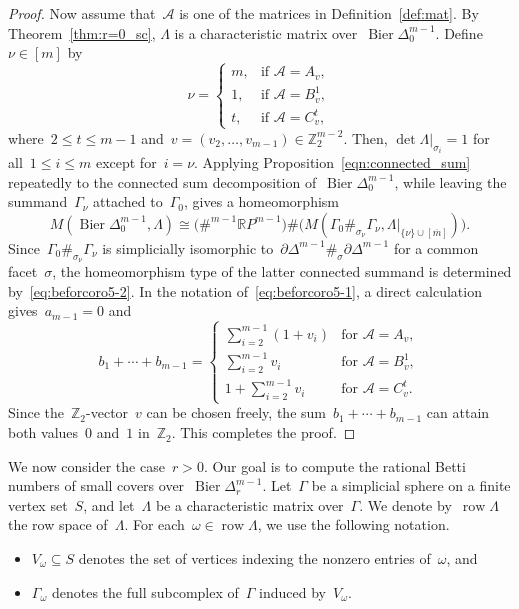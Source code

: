\documentclass[11pt]{amsart}
\theoremstyle{plain}
\numberwithin{equation}{section}
\theoremstyle{definition}
\newcommand{\Z}{\mathbb{Z}}
\newcommand{\cA}{\mathcal{A}}
\newcommand{\RP}{\mathbb{R}P}
\DeclareMathOperator{\row}{row}
\DeclareMathOperator{\Bier}{Bier}
\begin{document}
\begin{proof}
    Now assume that~$\cA$ is one of the matrices in Definition~\ref{def:mat}.
    By Theorem~\ref{thm:r=0_sc}, $\Lambda$ is a characteristic matrix over~$\Bier\Delta_{0}^{m-1}$.
    Define~$\nu \in[m]$ by
    $$
        \nu = \begin{cases}
            m, & \text{if } \cA = A_v ,\\
            1, & \text{if } \cA = B_v^1, \\
            t, & \text{if } \cA = C_v^t,
        \end{cases}
    $$
    where~$2 \leq t \leq m-1$ and~$v=(v_2,\ldots, v_{m-1})\in \Z_2^{m-2}$.
    Then, $\det \Lambda|_{\sigma_i} =1$ for all~$1 \leq i \leq m$ except for~$i = \nu$.
    Applying Proposition~\ref{eqn:connected_sum} repeatedly to the connected sum decomposition of~$\Bier\Delta_0^{m-1}$, while leaving the summand~$\Gamma_\nu$ attached to~$\Gamma_0$, gives a homeomorphism
    $$
        M(\Bier\Delta_{0}^{m-1},\Lambda) \cong \big( \#^{m-1}\RP^{m-1}\big) \# \big(M(\Gamma_0 \#_{\sigma_\nu}\Gamma_{\nu},\Lambda|_{\{\nu\}\cup[\overline{m}]})\big). 
    $$
    Since~$\Gamma_0 \#_{\sigma_\nu}\Gamma_{\nu}$ is simplicially isomorphic to~$\partial\Delta^{m-1}\#_{\sigma}\partial\Delta^{m-1}$ for a common facet~$\sigma$, the homeomorphism type of the latter connected summand is determined by~\eqref{eq:beforcoro5-2}.
    In the notation of~\eqref{eq:beforcoro5-1}, a direct calculation gives~$a_{m-1} =0$ and   
    $$
        b_1+\cdots +b_{m-1} =
            \begin{cases}
                \sum\limits_{i=2}^{m-1}(1+v_i) & \text{for } \cA = A_v, \\
                \sum\limits_{i=2}^{m-1}v_i & \text{for } \cA = B^1_v, \\
                1+\sum\limits_{i=2}^{m-1}v_i & \text{for } \cA = C_v^t.
            \end{cases}
    $$
    Since the~$\Z_2$-vector~$v$ can be chosen freely, the sum~$b_1+\cdots+b_{m-1}$ can attain both values~$0$ and~$1$ in~$\Z_2$.
    This completes the proof.
\end{proof}

We now consider the case~$r>0$.
Our goal is to compute the rational Betti numbers of small covers over~$\Bier\Delta^{m-1}_{r}$.
Let~$\Gamma$ be a simplicial sphere on a finite vertex set~$S$, and let~$\Lambda$ be a characteristic matrix over~$\Gamma$. 
We denote by~$\row\Lambda$ the row space of~$\Lambda$.
For each~$\omega\in\row\Lambda$, we use the following notation.
\begin{itemize}
    \item $V_\omega\subseteq S$ denotes the set of vertices indexing the nonzero entries of~$\omega$, and
    \item $\Gamma_\omega$ denotes the full subcomplex of~$\Gamma$ induced by~$V_\omega$. 
\end{itemize}
\end{document}
